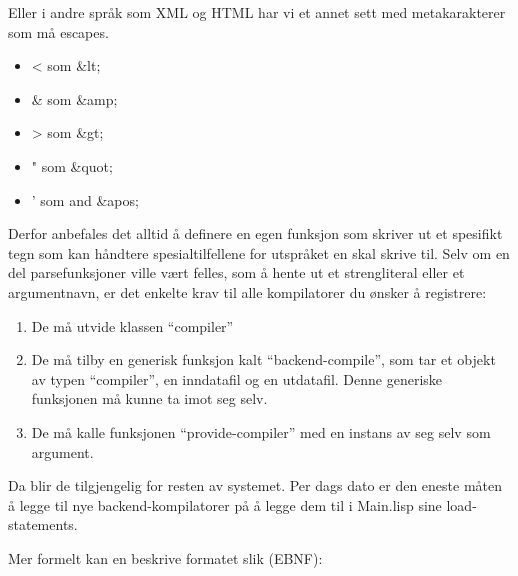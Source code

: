 \documentclass[norsk, 11pt, a4paper]{article}
\begin{document}
Eller i andre språk som XML og HTML har vi et annet sett med metakarakterer som må escapes.
\begin{itemize}
\item < som \&lt;
\item \& som \&amp;
\item > som \&gt;
\item " som \&quot;
\item ' som and \&apos;
\end{itemize}

Derfor anbefales det alltid å definere en egen funksjon som skriver ut et spesifikt tegn som kan håndtere spesialtilfellene for utspråket en skal skrive til. Selv om en del parsefunksjoner ville vært felles, som å hente ut et strengliteral eller et argumentnavn, er det enkelte krav til alle kompilatorer du ønsker å registrere:

\begin{enumerate}
\item De må utvide klassen ``compiler''
\item De må tilby en generisk funksjon kalt ``backend-compile'', som tar et objekt av typen ``compiler'', en inndatafil og en utdatafil. Denne generiske funksjonen må kunne ta imot seg selv.
\item De må kalle funksjonen ``provide-compiler'' med en instans av seg selv som argument.
\end{enumerate}

Da blir de tilgjengelig for resten av systemet. Per dags dato er den eneste måten å legge til nye backend-kompilatorer på å legge dem til i Main.lisp sine load-statements.


Mer formelt kan en beskrive formatet slik (EBNF):
\end{document}
